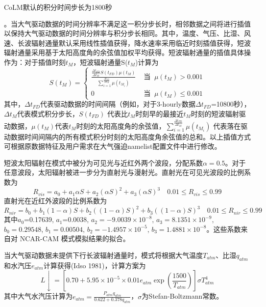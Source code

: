 \hypertarget{驱动数据时间尺度插值}{CoLM默认的积分时间步长为1800秒}。当大气驱动数据的时间分辨率不满足这一积分步长时，相邻数据之间将进行插值以保持大气驱动数据的时间分辨率与积分步长相同。其中，温度、气压、比湿、风速、长波辐射通量默认采用线性插值获得，降水速率采用临近时刻插值获得，短波辐射通量采用基于太阳高度角的余弦值加权平均获得。短波辐射通量的插值具体操作为：对于插值时刻$t_M$，短波辐射通量S($t_M$)计算为
\begin{equation}\label{t_M}
S\left(t_{M}\right)=\left\{\begin{array}{ll}\frac{\frac{\Delta t_{FD}}{\Delta t_{M}} S\left(t_{F D}\right) \mu\left(t_{M}\right)}{\sum_{i=1}^{\frac{\Delta t_{FD}}{\Delta t_{M}}} \mu\left(t_{M_{i}}\right)} & \text { 当 }\ \mu\left(t_{M}\right)>0.001 \\
0 & \text { 当 }\ \mu\left(t_{M}\right) \leq 0.001\end{array}\right.
\end{equation}
其中，$\Delta t_{FD}$代表驱动数据的时间间隔（例如，对于3-hourly数据$\Delta t_{FD}$=10800秒），$\Delta t_{M}$代表模式积分步长，$S(t_{FD})$ 代表比$t_M$时刻早的最接近$t_M$时刻的短波辐射驱动数据，$\mu\left(t_M\right)$代表$t_M$时刻的太阳高度角的余弦值，$
\sum_{i=1}^{\frac{\Delta t_{F D}}{\Delta t_{M}}} \mu\left(t_{M_{i}}\right)$
代表落在驱动数据时间间隔内的所有模式积分时刻的太阳高度角余弦值的总和。以上插值方式可根据原数据特征及用户需求在大气强迫namelist配置文件中进行修改。

短波太阳辐射在模式中被分为可见光与近红外两个波段，分配系数$\alpha=0.5$。对于任意波段，太阳辐射被进一步分为直射光与漫射光。直射光在可见光波段的比例系数为
\begin{equation}\label{R_vis}
R_{vis}=a_{0}+a_{1} \alpha S+a_{2}(\alpha S)^{2}+a_{3}(\alpha S)^{3} \quad 0.01 \leq R_{vis} \leq 0.99
\end{equation}
直射光在近红外波段的比例系数为
\begin{equation}
R_{nir}=b_{0}+b_{1}(1-\alpha) S+b_{2}((1-\alpha) S)^{2}+b_{3}((1-\alpha) S)^{3} \quad 0.01 \leq R_{nir} \leq 0.99
\end{equation}
其中$a_0$=0.17639, $a_1$=0.0038, $a_2=-9.0039\times{10}^{-8}$, $a_3=8.1351\times10^{-9}$, $b_0=0.29548$, $b_1=0.00504$, $b_2=-1.4957\times10^{-5}$, $b_3=1.4881\times10^{-8}$。这些系数来自对 NCAR-CAM 模式模拟结果的拟合。



当大气驱动数据未提供下行长波辐射通量时，模式将根据大气温度$T_{atm}$、比湿$q_{atm}$和水汽压$e_{atm}$计算获得(Idso 1981)，计算方案为
\begin{equation}\label{L_downarrow}
L \downarrow=\left[0.70+5.95 \times 10^{-5} \times 0.01 e_{a t m} \exp \left(\frac{1500}{T_{a t m}}\right)\right] \sigma T_{a t m}^{4}
\end{equation}
其中大气水汽压计算为$e_{a t m}=\frac{P_{a t m} q_{a t m}}{0.622+0.378 q_{a t m}}$，$\sigma$为Stefan-Boltzmann常数。

